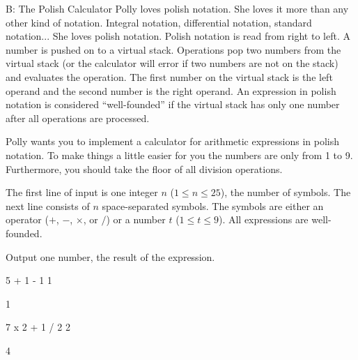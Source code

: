 \begin{problem}{B: The Polish Calculator}
Polly loves polish notation.
She loves it more than any other kind of notation.
Integral notation, differential notation, standard notation...
She loves polish notation.
Polish notation is read from right to left.
A number is pushed on to a virtual stack.
Operations pop two numbers from the virtual stack (or the calculator will error if two numbers are not on the stack) and evaluates the operation.
The first number on the virtual stack is the left operand and the second number is the right operand.
An expression in polish notation is considered ``well-founded'' if the virtual stack has only one number after all operations are processed.

Polly wants you to implement a calculator for arithmetic expressions in polish notation.
To make things a little easier for you the numbers are only from 1 to 9.
Furthermore, you should take the floor of all division operations.
\end{problem}

\begin{formalin}
The first line of input is one integer $n$ ($1 \leq n \leq 25$), the number of symbols.
The next line consists of $n$ space-separated symbols.
The symbols are either an operator ($+$, $-$, $\times$, or $/$) or a number $t$ ($1 \leq t \leq 9$).
All expressions are well-founded.
\end{formalin}

\begin{formalout}
Output one number, the result of the expression.
\end{formalout}

\begin{datain}
5
+ 1 - 1 1
\end{datain}
\begin{dataout}
1
\end{dataout}

\begin{datain}
7
x 2 + 1 / 2 2
\end{datain}
\begin{dataout}
4
\end{dataout}

